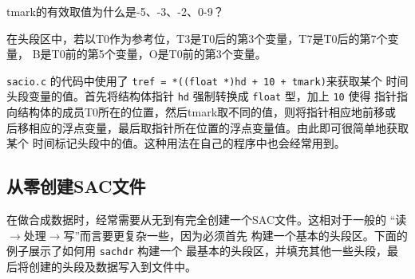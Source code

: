 \begin{note}
tmark的有效取值为什么是-5、-3、-2、0-9？

在头段区中，若以T0作为参考位，T3是T0后的第3个变量，T7是T0后的第7个变量，
B是T0前的第5个变量，O是T0前的第3个变量。

\texttt{sacio.c} 的代码中使用了 \verb|tref = *((float *)hd + 10 + tmark)|来获取某个
时间头段变量的值。首先将结构体指针 \texttt{hd} 强制转换成 \texttt{float} 型，加上 \texttt{10} 使得
指针指向结构体的成员T0所在的位置，然后tmark取不同的值，则将指针相应地前移或
后移相应的浮点变量，最后取指针所在位置的浮点变量值。由此即可很简单地获取某个
时间标记头段中的值。这种用法在自己的程序中也会经常用到。
\end{note}

\subsection{从零创建SAC文件}
在做合成数据时，经常需要从无到有完全创建一个SAC文件。这相对于一般的
``读$\rightarrow$处理$\rightarrow$写''而言要更复杂一些，因为必须首先
构建一个基本的头段区。下面的例子展示了如何用 \texttt{sachdr} 构建一个
最基本的头段区，并填充其他一些头段，最后将创建的头段及数据写入到文件中。
\inputminted{C}{./sacio/write_sac.c}
